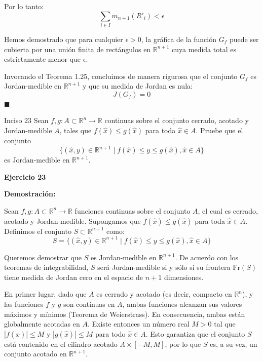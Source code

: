 \documentclass[11pt,letterpaper]{article}
\begin{document}
Por lo tanto:
\begin{equation*}
\sum_{i \in I} m_{n+1}(R'_i) < \epsilon
\end{equation*}

Hemos demostrado que para cualquier $\epsilon > 0$, la gráfica de la función $G_f$ puede ser cubierta por una unión finita de rectángulos en $\mathbb{R}^{n+1}$ cuya medida total es estrictamente menor que $\epsilon$. 

Invocando el Teorema 1.25, concluimos de manera rigurosa que el conjunto $G_f$ es Jordan-medible en $\mathbb{R}^{n+1}$ y que su medida de Jordan es nula:
\begin{equation*}
J(G_f) = 0
\end{equation*}
\hfill $\blacksquare$

\begin{inciso}{Inciso 23}
Sean $f,g:A\subset\mathbb{R}^{n}\rightarrow\mathbb{R}$ continuas sobre el conjunto cerrado, acotado y Jordan-medible $A$, tales que $f(\hat{x})\le g(\hat{x})$ para toda $\hat{x}\in A$. Pruebe que el conjunto
\begin{equation*}
    \{(\hat{x},y)\in\mathbb{R}^{n+1}\mid f(\hat{x})\le y\le g(\hat{x}),\hat{x}\in A\}
\end{equation*}
es Jordan-medible en $\mathbb{R}^{n+1}$.
\end{inciso}

\textbf{Ejercicio 23}

\textbf{Demostración:}

Sean $f, g: A \subset \mathbb{R}^n \rightarrow \mathbb{R}$ funciones continuas sobre el conjunto $A$, el cual es cerrado, acotado y Jordan-medible. Supongamos que $f(\hat{x}) \le g(\hat{x})$ para toda $\hat{x} \in A$. Definimos el conjunto $S \subset \mathbb{R}^{n+1}$ como:
\begin{equation*}
S = \{(\hat{x}, y) \in \mathbb{R}^{n+1} \mid f(\hat{x}) \le y \le g(\hat{x}), \hat{x} \in A\}
\end{equation*}

Queremos demostrar que $S$ es Jordan-medible en $\mathbb{R}^{n+1}$. De acuerdo con los teoremas de integrabilidad, $S$ será Jordan-medible si y sólo si su frontera $\text{Fr}(S)$ tiene medida de Jordan cero en el espacio de $n+1$ dimensiones.

En primer lugar, dado que $A$ es cerrado y acotado (es decir, compacto en $\mathbb{R}^n$), y las funciones $f$ y $g$ son continuas en $A$, ambas funciones alcanzan sus valores máximos y mínimos (Teorema de Weierstrass). En consecuencia, ambas están globalmente acotadas en $A$. Existe entonces un número real $M > 0$ tal que $|f(\hat{x})| \le M$ y $|g(\hat{x})| \le M$ para todo $\hat{x} \in A$. Esto garantiza que el conjunto $S$ está contenido en el cilindro acotado $A \times [-M, M]$, por lo que $S$ es, a su vez, un conjunto acotado en $\mathbb{R}^{n+1}$.
\end{document}
